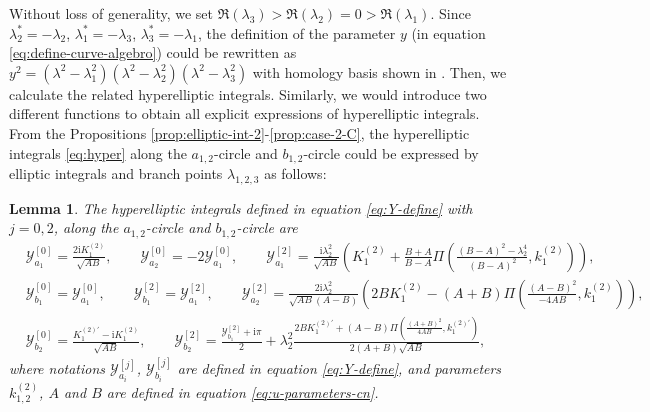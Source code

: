 \documentclass[11pt,reqno]{amsart}
\newcommand{\ii}{\mathrm{i}}
\newtheorem{lemma}{Lemma}
\numberwithin{equation}{section}
\begin{document}
Without loss of generality, we set $\Re(\lambda_3)>\Re(\lambda_2)=0>\Re(\lambda_1)$.
Since $\lambda_2^*=-\lambda_2$, $\lambda_1^*=-\lambda_3$, $\lambda_3^*=-\lambda_1$, the definition of the parameter $y$ (in equation \eqref{eq:define-curve-algebro}) could be rewritten as $y^2=(\lambda^2-\lambda_1^2)(\lambda^2-\lambda_2^2)(\lambda^2-\lambda_3^2)$ with homology basis shown in . 
Then, we calculate the related hyperelliptic integrals. 
Similarly, we would introduce two different functions to obtain all explicit expressions of hyperelliptic integrals.
From the Propositions \ref{prop:elliptic-int-2}-\ref{prop:case-2-C}, 
the hyperelliptic integrals \eqref{eq:hyper} along the $a_{1,2}$-circle and $b_{1,2}$-circle could be expressed by elliptic integrals and branch points $\lambda_{1,2,3}$ as follows: 
\begin{lemma}\label{lemma:cn-1-int}
 	The hyperelliptic integrals defined in equation \eqref{eq:Y-define} with $j=0,2$, along the $a_{1,2}$-circle and $b_{1,2}$-circle are
	\begin{equation}\nonumber
		\begin{split}
			&\mathcal{Y}_{a_1}^{[0]}=\frac{2\ii   K^{(2)}_1}{\sqrt{AB}}, 
			\qquad
			\mathcal{Y}_{a_2}^{[0]}=-2\mathcal{Y}_{a_1}^{[0]}, 
			\qquad
			\mathcal{Y}_{a_1}^{[2]}=\frac{\ii\lambda_2^2 }{\sqrt{AB}}\left(  K^{(2)}_1 +\frac{B+A}{B-A}\Pi\left(\frac{(B-A)^2-\lambda_2^4}{(B-A)^2},  k^{(2)}_1\right)\right), \\
			& \mathcal{Y}_{b_1}^{[0]}=\mathcal{Y}_{a_1}^{[0]},\qquad \mathcal{Y}_{b_1}^{[2]}=\mathcal{Y}_{a_1}^{[2]}, \qquad
			\mathcal{Y}_{a_2}^{[2]}=\frac{2\ii \lambda_2^2}{\sqrt{AB}(A-B)}\left(2B  K^{(2)}_1-(A+B)\Pi\left(\frac{(A-B)^2}{-4AB},  k^{(2)}_1\right)\right),  \\
			& 
			\mathcal{Y}_{b_2}^{[0]}=\frac{K^{(2)\prime}_1-\ii  K^{(2)}_1}{\sqrt{AB}}, \qquad
			\mathcal{Y}_{b_2}^{[2]}=\frac{\mathcal{Y}_{b_1}^{[2]}+\ii \pi}{2}+\lambda_2^2\frac{2B  K^{(2)\prime}_1+(A-B)\Pi\left(\frac{(A+B)^2}{4AB},  k^{(2)\prime}_1\right)}{2(A+B)\sqrt{AB}},
		\end{split}
	\end{equation}
	where notations $\mathcal{Y}_{a_i}^{[j]}$, $\mathcal{Y}_{b_i}^{[j]}$ are defined in equation \eqref{eq:Y-define}, and parameters $k^{(2)}_{1,2}$, $A$ and $B$ are defined in equation \eqref{eq:u-parameters-cn}.
\end{lemma}
\end{document}
